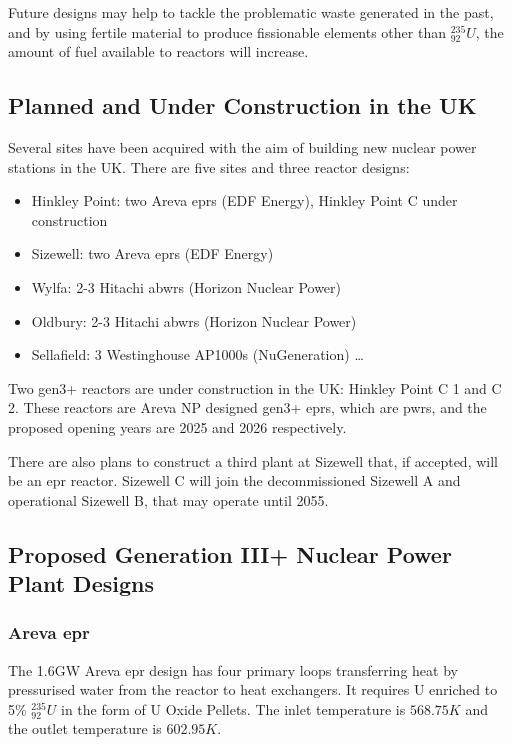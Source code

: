 Future designs may help to tackle the problematic waste generated in the past, and by using fertile material to produce fissionable elements other than ${}^{235}_{92}U$, the amount of fuel available to reactors will increase. 




\subsection{Planned and Under Construction in the UK}


Several sites have been acquired with the aim of building new nuclear power stations in the UK.  There are five sites and three reactor designs\cite{ocw01}:

\begin{itemize}
\item Hinkley Point: two Areva \acrshort{epr}s (EDF Energy), Hinkley Point C under construction
\item Sizewell: two Areva \acrshort{epr}s (EDF Energy)
\item Wylfa: 2-3 Hitachi \acrshort{abwr}s (Horizon Nuclear Power)
\item Oldbury: 2-3 Hitachi \acrshort{abwr}s (Horizon Nuclear Power)
\item Sellafield: 3 Westinghouse AP1000s (NuGeneration)
\ldots 
\end{itemize}

Two \acrshort{gen3+} reactors are under construction in the UK: Hinkley Point C 1 and C 2.  These reactors are Areva NP designed \acrshort{gen3+} \acrshort{epr}s, which are \acrshort{pwr}s, and the proposed opening years are 2025 and 2026 respectively.  

There are also plans to construct a third plant at Sizewell that, if accepted, will be an \acrshort{epr} reactor.  Sizewell C will join the decommissioned Sizewell A and operational Sizewell B, that may operate until 2055.




\subsection{Proposed Generation III+ Nuclear Power Plant Designs}


\subsubsection{Areva \acrshort{epr}}

The 1.6GW Areva \acrshort{epr} design has four primary loops transferring heat by pressurised water from the reactor to heat exchangers.  It requires U enriched to 5\% ${}^{235}_{92}U$ in the form of U Oxide Pellets.  The inlet temperature is $568.75K$ and the outlet temperature is $602.95K$.

